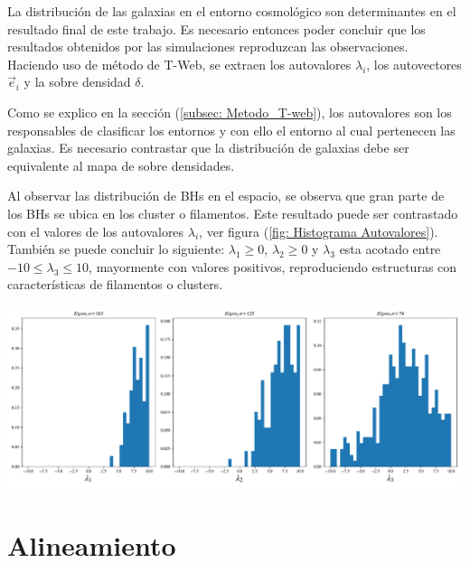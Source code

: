 La distribución de las galaxias en el entorno cosmológico son determinantes en el resultado final de este trabajo. Es necesario entonces poder concluir que los resultados obtenidos por las simulaciones reproduzcan las observaciones. Haciendo uso de método de T-Web, se extraen los autovalores $\lambda_{i}$, los autovectores $\vec{e}_{i}$ y la sobre densidad $\delta$. 

Como se explico en la sección (\ref{subsec: Metodo_T-web}),  los autovalores son los responsables de clasificar los entornos y con ello el entorno al cual pertenecen las galaxias. Es necesario contrastar que la distribución de galaxias debe ser equivalente al mapa de sobre densidades. 


Al observar las distribución de BHs en el espacio, se observa que gran parte de los BHs se ubica en los cluster o filamentos. Este resultado puede ser contrastado con el valores de los autovalores $\lambda_{i}$, ver figura (\ref{fig: Histograma Autovalores}). También se puede concluir lo siguiente:  $\lambda_{1}\geq 0$,  $\lambda_{2}\geq 0$ y $\lambda_{3}$ esta acotado entre $-10 \leq \lambda_{3}\leq 10$, mayormente con valores positivos, reproduciendo estructuras con características de filamentos o clusters. 
%
\begin{center}
\includegraphics[scale=.38]{./figures/6_Resultados/cosmo01/histograma_autovalores2.pdf}
\label{fig: Histograma Autovalores}
\end{center}
%




\section{ Alineamiento}
\label{sec: Alineamiento}

